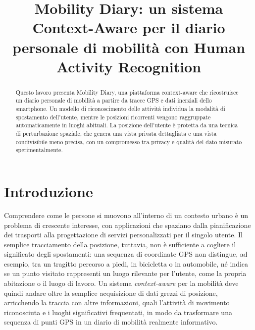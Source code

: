 \documentclass[conference]{IEEEtran}
\begin{document}
\title{Mobility Diary: un sistema Context-Aware per il diario personale
di mobilità con Human Activity Recognition}

\author{
}

\maketitle

\begin{abstract}
Questo lavoro presenta Mobility Diary, una piattaforma context-aware
che ricostruisce un diario personale di mobilità a partire da tracce
GPS e dati inerziali dello smartphone. Un modello di riconoscimento
delle attività individua la modalità di spostamento dell'utente,
mentre le posizioni ricorrenti vengono raggruppate automaticamente in
luoghi abituali. La posizione dell'utente è
protetta da una tecnica di perturbazione spaziale, che genera una
vista privata dettagliata e una vista condivisibile meno precisa, con
un compromesso tra privacy e qualità del dato misurato
sperimentalmente.
\end{abstract}

\section{Introduzione}

Comprendere come le persone si muovono all'interno di un contesto urbano è
un problema di crescente interesse, con applicazioni che spaziano dalla
pianificazione dei trasporti alla progettazione di servizi personalizzati
per il singolo utente. Il semplice tracciamento della posizione, tuttavia,
non è sufficiente a cogliere il significato degli spostamenti: una
sequenza di coordinate GPS non distingue, ad esempio, tra un tragitto
percorso a piedi, in bicicletta o in automobile, né indica se un punto
visitato rappresenti un luogo rilevante per l'utente, come la propria
abitazione o il luogo di lavoro. Un sistema \emph{context-aware} per la
mobilità deve quindi andare oltre la semplice acquisizione di dati grezzi
di posizione, arricchendo la traccia con altre informazioni, 
quali l'attività di movimento riconosciuta e i luoghi significativi
frequentati, in modo da trasformare una sequenza di punti GPS in un
diario di mobilità realmente informativo.
\end{document}
